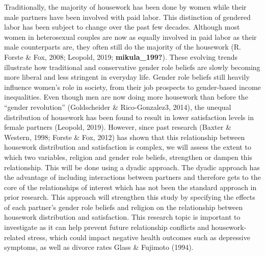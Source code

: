 \documentclass[
  man,floatsintext]{apa6}
\begin{document}
Traditionally, the majority of housework has been done by women while their male partners have been involved with paid labor. This distinction of gendered labor has been subject to change over the past few decades. Although most women in heterosexual couples are now as equally involved in paid labor as their male counterparts are, they often still do the majority of the housework (R. Forste \& Fox, 2008; Leopold, 2019; \textbf{mikula\_199?}). These evolving trends illustrate how traditional and conservative gender role beliefs are slowly becoming more liberal and less stringent in everyday life. Gender role beliefs still heavily influence women's role in society, from their job prospects to gender-based income inequalities. Even though men are now doing more housework than before the ``gender revolution'' (Goldscheider \& Rico-Gonzalez3, 2014), the unequal distribution of housework has been found to result in lower satisfaction levels in female partners (Leopold, 2019). However, since past research (Baxter \& Western, 1998; Forste \& Fox, 2012) has shown that this relationship between housework distribution and satisfaction is complex, we will assess the extent to which two variables, religion and gender role beliefs, strengthen or dampen this relationship.
This will be done using a dyadic approach. The dyadic approach has the advantage of including interactions between partners and therefore gets to the core of the relationships of interest which has not been the standard approach in prior research. This approach will strengthen this study by specifying the effects of each partner's gender role beliefs and religion on the relationship between housework distribution and satisfaction.
This research topic is important to investigate as it can help prevent future relationship conflicts and housework-related stress, which could impact negative health outcomes such as depressive symptoms, as well as divorce rates Glass \& Fujimoto (1994).
\end{document}
